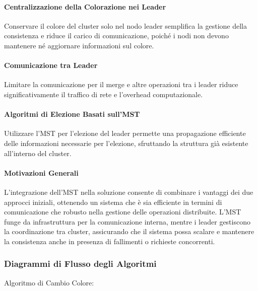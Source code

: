 \documentclass[12pt, a4paper]{report}
\begin{document}
\paragraph{Centralizzazione della Colorazione nei Leader}

Conservare il colore del cluster solo nel nodo leader semplifica la gestione della consistenza e riduce il carico di comunicazione, poiché i nodi non devono mantenere né aggiornare informazioni sul colore.

\paragraph{Comunicazione tra Leader}

Limitare la comunicazione per il merge e altre operazioni tra i leader riduce significativamente il traffico di rete e l'overhead computazionale.

\paragraph{Algoritmi di Elezione Basati sull'MST}

Utilizzare l'MST per l'elezione del leader permette una propagazione efficiente delle informazioni necessarie per l'elezione, sfruttando la struttura già esistente all'interno del cluster.

\paragraph{Motivazioni Generali}

L'integrazione dell'MST nella soluzione consente di combinare i vantaggi dei due approcci iniziali, ottenendo un sistema che è sia efficiente in termini di comunicazione che robusto nella gestione delle operazioni distribuite. L'MST funge da infrastruttura per la comunicazione interna, mentre i leader gestiscono la coordinazione tra cluster, assicurando che il sistema possa scalare e mantenere la consistenza anche in presenza di fallimenti o richieste concorrenti.

\subsubsection{Diagrammi di Flusso degli Algoritmi}

Algoritmo di Cambio Colore:
\end{document}
